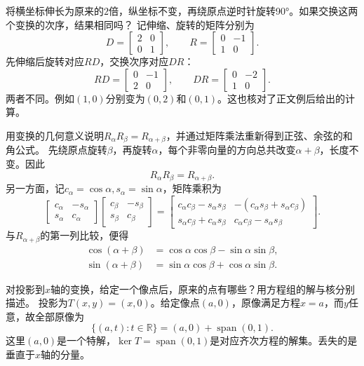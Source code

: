 将横坐标伸长为原来的\(2\)倍，纵坐标不变，再绕原点逆时针旋转90°。如果交换这两个变换的次序，结果相同吗？
\solutionanswer
记伸缩、旋转的矩阵分别为
\[
D=\begin{bmatrix}2&0\\0&1\end{bmatrix},\qquad
R=\begin{bmatrix}0&-1\\1&0\end{bmatrix}.
\]
先伸缩后旋转对应\(RD\)，交换次序对应\(DR\)：
\[
RD=\begin{bmatrix}0&-1\\2&0\end{bmatrix},\qquad
DR=\begin{bmatrix}0&-2\\1&0\end{bmatrix}.
\]
两者不同。例如\((1,0)\)分别变为\((0,2)\)和\((0,1)\)。这也核对了正文例后给出的计算。


用变换的几何意义说明\(R_{\alpha} R_{\beta} = R_{\alpha + \beta}\)，并通过矩阵乘法重新得到正弦、余弦的和角公式。
\solutionanswer
先绕原点旋转\(\beta\)，再旋转\(\alpha\)，每个非零向量的方向总共改变\(\alpha+\beta\)，长度不变。因此
\[
R_\alpha R_\beta=R_{\alpha+\beta}.
\]
另一方面，记\(c_\alpha=\cos\alpha,s_\alpha=\sin\alpha\)，矩阵乘积为
\[
\begin{bmatrix}c_\alpha&-s_\alpha\\s_\alpha&c_\alpha\end{bmatrix}
\begin{bmatrix}c_\beta&-s_\beta\\s_\beta&c_\beta\end{bmatrix}
=
\begin{bmatrix}
c_\alpha c_\beta-s_\alpha s_\beta&
-(c_\alpha s_\beta+s_\alpha c_\beta)\\
s_\alpha c_\beta+c_\alpha s_\beta&
c_\alpha c_\beta-s_\alpha s_\beta
\end{bmatrix}.
\]
与\(R_{\alpha+\beta}\)的第一列比较，便得
\[
\begin{aligned}
\cos(\alpha+\beta)&=\cos\alpha\cos\beta-\sin\alpha\sin\beta,\\
\sin(\alpha+\beta)&=\sin\alpha\cos\beta+\cos\alpha\sin\beta.
\end{aligned}
\]


对投影到\(x\)轴的变换，给定一个像点后，原来的点有哪些？用方程组的解与核分别描述。
\solutionanswer
投影为\(T(x,y)=(x,0)\)。给定像点\((a,0)\)，原像满足方程\(x=a\)，而\(y\)任意，故全部原像为
\[
\{(a,t):t\in\mathbb R\}=(a,0)+\operatorname{span}(0,1).
\]
这里\((a,0)\)是一个特解，\(\ker T=\operatorname{span}(0,1)\)是对应齐次方程的解集。丢失的是垂直于\(x\)轴的分量。


